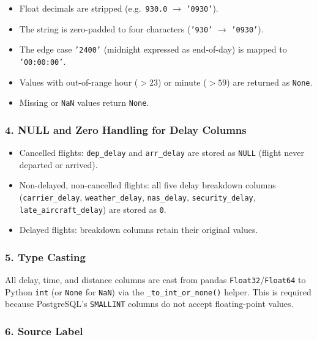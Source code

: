 \documentclass[12pt,a4paper]{article}
\begin{document}
\begin{itemize}
    \item Float decimals are stripped (e.g.\ \texttt{930.0} $\to$ \texttt{'0930'}).
    \item The string is zero-padded to four characters
          (\texttt{'930'} $\to$ \texttt{'0930'}).
    \item The edge case \texttt{'2400'} (midnight expressed as end-of-day) is
          mapped to \texttt{'00:00:00'}.
    \item Values with out-of-range hour ($>23$) or minute ($>59$) are
          returned as \texttt{None}.
    \item Missing or \texttt{NaN} values return \texttt{None}.
\end{itemize}

\subsubsection*{4. NULL and Zero Handling for Delay Columns}

\begin{itemize}
    \item Cancelled flights: \texttt{dep\_delay} and \texttt{arr\_delay} are
          stored as \texttt{NULL} (flight never departed or arrived).
    \item Non-delayed, non-cancelled flights: all five delay breakdown columns
          (\texttt{carrier\_delay}, \texttt{weather\_delay},
          \texttt{nas\_delay}, \texttt{security\_delay},
          \texttt{late\_aircraft\_delay}) are stored as \texttt{0}.
    \item Delayed flights: breakdown columns retain their original values.
\end{itemize}

\subsubsection*{5. Type Casting}

All delay, time, and distance columns are cast from pandas
\texttt{Float32}/\texttt{Float64} to Python \texttt{int} (or \texttt{None}
for \texttt{NaN}) via the \texttt{\_to\_int\_or\_none()} helper. This is
required because PostgreSQL's \texttt{SMALLINT} columns do not accept
floating-point values.

\subsubsection*{6. Source Label}
\end{document}
